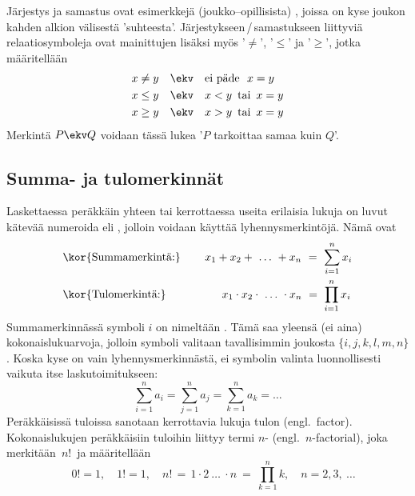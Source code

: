 Järjestys ja samastus ovat esimerkkejä (joukko--opillisista) , joissa on kyse joukon
kahden alkion välisestä 'suhteesta'. Järjestykseen\,/\,samastukseen liittyviä relaatiosymboleja ovat 
mainittujen lisäksi myös '$\neq$', '$\le$' ja '$\ge$', jotka määritellään
\begin{align*}
x \neq y \quad &\ekv \quad \text{ei päde}\ \ x=y \\
x \le y  \quad &\ekv \quad x < y\,\ \text{tai}\,\ x = y \\
x \ge y  \quad &\ekv \quad x > y\,\ \text{tai}\,\ x = y
\end{align*}
Merkintä $P \ekv Q$ voidaan tässä lukea '$P$ tarkoittaa samaa kuin $Q$'.

\subsection{Summa- ja tulomerkinnät}

Laskettaessa peräkkäin yhteen tai kerrottaessa useita erilaisia lukuja on luvut kätevää 
numeroida eli , jolloin voidaan käyttää lyhennysmerkintöjä. Nämä ovat 
\begin{align*}
&\text{\kor{Summamerkintä:}} \qquad\, x_1 + x_2 + \ \ldots\  + x_n\ =\ \sum_{i=1}^n x_i \\
&\text{\kor{Tulomerkintä:}} \qquad\qquad\quad x_1 \cdot x_2 \cdot\ \ldots\ \cdot x_n\ 
                                                                    =\ \prod_{i=1}^n x_i
\end{align*}
Summamerkinnässä symboli $i$ on nimeltään . Tämä saa yleensä (ei aina)
kokonaislukuarvoja, jolloin symboli valitaan tavallisimmin joukosta $\{i,j,k,l,m,n\}$.
Koska kyse on vain lyhennysmerkinnästä, ei symbolin valinta luonnollisesti vaikuta itse 
laskutoimitukseen:
\[
\sum_{i=1}^n a_i = \sum_{j=1}^n a_j = \sum_{k=1}^n a_k = \ldots
\]
Peräkkäisissä tuloissa sanotaan kerrottavia lukuja tulon  (engl.\ factor).
Kokonaislukujen peräkkäisiin tuloihin liittyy termi $n$-\kor{kertoma} (engl.\ $n$-factorial),
joka merkitään $\,n!\,$ ja määritellään
\[
\quad 0! = 1, \quad 1! = 1, \quad n!\,=\,1 \cdot 2 \ \ldots\ \cdot n\ 
                                      =\ \prod_{k=1}^n k, \quad n = 2,3,\ \ldots
\]



